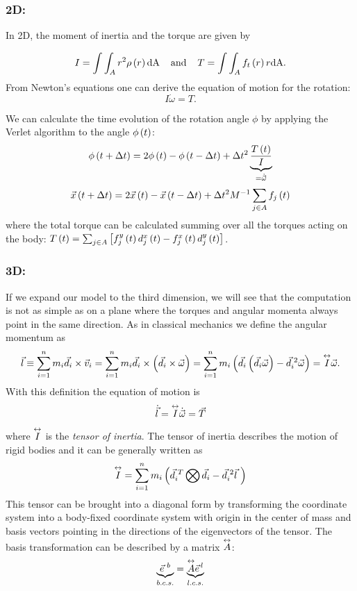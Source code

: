 \subsubsection*{2D:}
In 2D,  the moment of inertia and the torque are given by

$$
I = \int\int_{A}{r^2 \rho \left(r\right) \text{dA}}
\hspace{0.4cm}\text{and}\hspace{0.4cm} 
T = \int\int_{A}{f_t\left(r\right) r \text{dA}}.
\label{eq:cof_eom}
$$
From Newton's equations one can derive the equation of motion for the rotation:
\begin{equation}
I\dot{\omega} = T.
\label{eq:eom_rot}
\end{equation}

We can calculate the time evolution of the rotation angle $\phi$ by applying the Verlet algorithm to the angle $\phi\left(t\right)$:
$$
\phi\left(t+\Delta t\right) = 2 \phi\left(t\right) -\phi\left(t-\Delta t\right) + \Delta t^2 \underbrace{ \frac{T\left(t\right)}{I}}_{=\dot{\vec{\omega}}}
$$
 $$
\vec{x}\left(t+\Delta t\right) = 2 \vec{x}\left(t\right) -\vec{x}\left(t-\Delta t\right) + \Delta t^2 M^{-1} \sum_{j\in A} {f_j\left(t\right)}
 $$
 where the total torque can be calculated summing over all the torques acting on the body: $T\left(t\right) = \sum_{j\in A} \left[    f^y_j\left(t\right) d^x_j\left(t\right) -  f^x_j\left(t\right) d^y_j\left(t\right)     \right]$. 
 

\subsubsection*{3D:}
If we expand our model to the third dimension, we will see that the computation is not as simple as on a plane where the torques and angular momenta always point in the same direction. As in classical mechanics we define the angular momentum as
$$
\vec{l} \equiv \sum_{i=1}^n{m_i\vec{d}_i \times \vec{v}_i} 
= \sum_{i=1}^n{m_i\vec{d}_i \times \left(\vec{d}_i \times \vec{\omega}\right)} 
= \sum_{i=1}^n {m_i   \left(\vec{d}_i    \left(\vec{d}_i \vec{\omega}\right)   -\vec{d}_i^{\,\,2}\vec{\omega} \right)  }     
= \overset{\leftrightarrow}{I} \vec{\omega}.
$$
With this definition the equation of motion is
$$
\dot{\vec{l}} = \overset{\leftrightarrow}{I}\dot{\vec{\omega}} = \vec{T}
$$  
where $\overset{\leftrightarrow}{I}$ is the \emph{tensor of inertia}. The tensor of inertia describes the motion of rigid bodies and it can be generally written as
$$
\overset{\leftrightarrow}{I} = \sum _{i=1}^n {m_i \left(  \vec{d}_i^{\,\,T}  \bigotimes    \vec{d}_i   -\vec{d}_i^{\,\,2} \vec{l}\,\,    \right)       }
$$
 This tensor can be brought into a diagonal form by transforming the coordinate system into a body-fixed coordinate system with origin in the center of mass and basis vectors pointing in the directions of the eigenvectors of the tensor. The basis transformation can be described by a matrix $\overset{\leftrightarrow}{A}$:
 \begin{equation}
\underbrace{ \vec{e}^{\,\,b} }_{b.c.s.}= \underbrace{ \overset{\leftrightarrow}{A}\vec{e}^{\,l} }_{l.c.s.}
\label{eq:transf_mat}
\end{equation}

